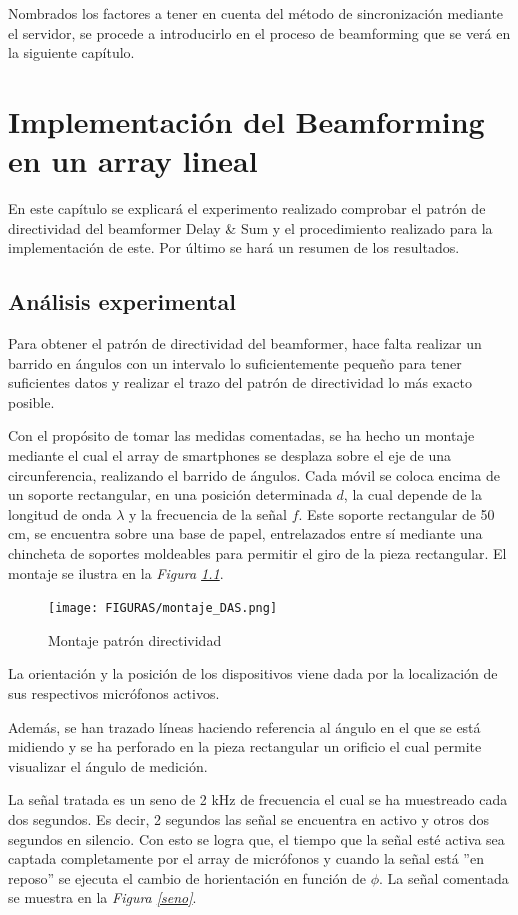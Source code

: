 \documentclass[a4paper,11pt]{book}
\begin{document}
Nombrados los factores a tener en cuenta del método de sincronización mediante el servidor, se procede a introducirlo en el proceso de beamforming que se verá en la siguiente capítulo.

\chapter{Implementación del Beamforming en un array lineal}
 En este capítulo se explicará el experimento realizado comprobar el patrón de directividad del beamformer Delay \& Sum y el procedimiento realizado para la implementación de este. Por último se hará un resumen de los resultados.
 
\section{Análisis experimental}
Para obtener el patrón de directividad del beamformer, hace falta realizar un barrido en ángulos con un intervalo lo suficientemente pequeño para tener suficientes datos y realizar el trazo del patrón de directividad lo más exacto posible.

Con el propósito de tomar las medidas comentadas, se ha hecho un montaje mediante el cual el array de smartphones se desplaza sobre el eje de una circunferencia, realizando el barrido de ángulos. Cada móvil se coloca encima de un soporte rectangular, en una posición determinada $d$, la cual depende de la longitud de onda $\lambda$ y la frecuencia de la señal $f$. Este soporte rectangular de 50 cm, se encuentra sobre una base de papel, entrelazados entre sí mediante una chincheta de soportes moldeables para permitir el giro de la pieza rectangular. El montaje se ilustra en la \textit{Figura \ref{montaje_DAS}}.

\begin{figure}[hbtp]
\centering
\texttt{[image: FIGURAS/montaje\_DAS.png]}
\caption{Montaje patrón directividad}
\label{montaje_DAS}
\end{figure}

La orientación y la posición de los dispositivos viene dada por la localización de sus respectivos micrófonos activos. 

Además, se han trazado líneas haciendo referencia al ángulo en el que se está midiendo y se ha perforado en la pieza rectangular un orificio el cual permite visualizar el ángulo de medición.

La señal tratada es un seno de 2 kHz de frecuencia el cual se ha muestreado cada dos segundos. Es decir, 2 segundos las señal se encuentra en activo y otros dos segundos en silencio. Con esto se logra que, el tiempo que la señal esté activa sea captada completamente por el array de micrófonos y cuando la señal está ''en reposo'' se ejecuta el cambio de horientación en función de $\phi$. La señal comentada se muestra en la \textit{Figura \ref{seno}}.
\end{document}
